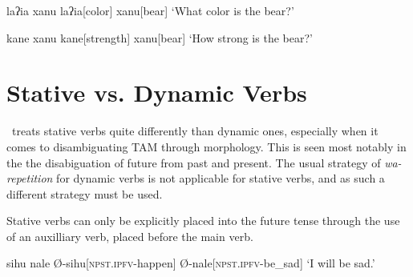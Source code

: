 \begin{paracol}{2}
\ex
\begingl
\glpreamble laʔia xanu
\endpreamble
laʔia[color]
xanu[bear]
\glft `What color is the bear?'
\endgl
\xe
\switchcolumn

\ex
\begingl
\glpreamble kane xanu
\endpreamble
kane[strength]
xanu[bear]
\glft `How strong is the bear?'
\endgl
\xe
\end{paracol}



\section{Stative vs. Dynamic Verbs}
\label{sec:stative}
\langname\ treats stative verbs quite differently than dynamic ones, especially when it comes to disambiguating TAM through morphology. This is seen most notably in the the disabiguation of future from past and present. The usual strategy of \textit{wa-repetition} for dynamic verbs is not applicable for stative verbs, and as such a different strategy must be used.

Stative verbs can only be explicitly placed into the future tense through the use of an auxilliary verb,  placed before the main verb.

\ex
\begingl
\glpreamble sihu nale
\endpreamble
Ø-sihu[\textsc{npst.ipfv-}happen]
Ø-nale[\textsc{npst.ipfv-}be\_sad]
\glft `I will be sad.'
\endgl
\xe

